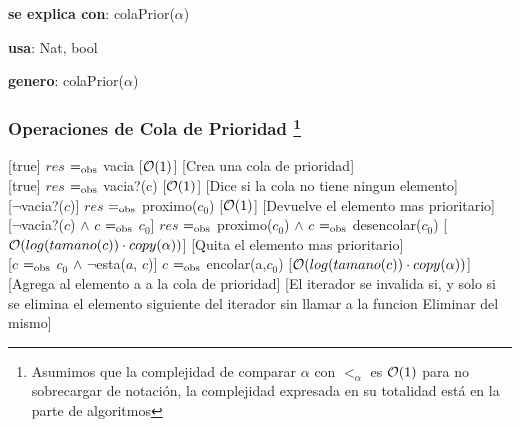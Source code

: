 




\begin{Interfaz}

  \textbf{se explica con}: colaPrior($\alpha$)

  \textbf{usa}: Nat, bool
  
  \textbf{genero}: colaPrior($\alpha$)


  \subsubsection*{Operaciones de Cola de Prioridad \footnote{Asumimos que la complejidad de comparar $\alpha$ con $<_\alpha$ es $\mathcal{O}(1)$ para no sobrecargar de notación, la complejidad expresada en su totalidad está en la parte de algoritmos}}

  [true]
  {$res$ $=_{\mathrm{obs}}$ vacia}
  [$\mathcal{O}(1)$]
  [Crea una cola de prioridad]\\ 
  
  [true]
  {$res$ $=_{\mathrm{obs}}$ vacia?(c)}
  [$\mathcal{O}(1)$]
  [Dice si la cola no tiene ningun elemento]\\ 

  [$\neg$vacia?($c$)]
  {$res$ $=_{\mathrm{obs}}$ proximo($c_0$)}
  [$\mathcal{O}(1)$]
  [Devuelve el elemento mas prioritario]\\   
  
  [$\neg$vacia?($c$) $\land$ $c$ $=_{\mathrm{obs}}$ $c_0$]
  {$res$ $=_{\mathrm{obs}}$ proximo($c_0$) $\land$ $c$ $=_{\mathrm{obs}}$ desencolar($c_0$)}
  [$\mathcal{O}(log(tamano(c)) \cdot copy(\alpha))$]
  [Quita el elemento mas prioritario]\\   
  
  [$c$ $=_{\mathrm{obs}}$ $c_0$ $\land$ $\neg$esta($a$, $c$)] %
  {$c$ $=_{\mathrm{obs}}$ encolar(a,$c_0$)}
  [$\mathcal{O}(log(tamano(c)) \cdot copy(\alpha))$]
  [Agrega al elemento a a la cola de prioridad]
  [El iterador se invalida si, y solo si se elimina el elemento siguiente del iterador sin llamar a la funcion Eliminar del mismo]\\ 

\end{Interfaz}


